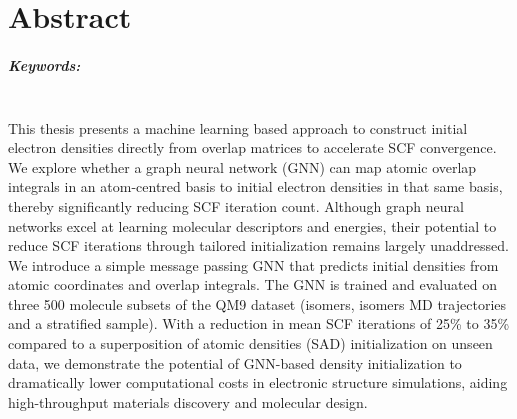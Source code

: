\chapter*{Abstract}

\paragraph{Keywords:}
\mykeywordsabstract\\

This thesis presents a machine learning based approach to construct initial electron densities directly from overlap matrices to accelerate SCF convergence. We explore whether a graph neural network (GNN) can map atomic overlap integrals in an atom-centred basis to initial electron densities in that same basis, thereby significantly reducing SCF iteration count. Although graph neural networks excel at learning molecular descriptors and energies, their potential to reduce SCF iterations through tailored initialization remains largely unaddressed. We introduce a simple message passing GNN that predicts initial densities from atomic coordinates and overlap integrals. The GNN is trained and evaluated on three 500 molecule subsets of the QM9 dataset (isomers, isomers MD trajectories and a stratified sample). With a reduction in mean SCF iterations of 25\% to 35\% compared to a superposition of atomic densities (SAD) initialization on unseen data, we demonstrate the potential of GNN-based density initialization to dramatically lower computational costs in electronic structure simulations, aiding high-throughput materials discovery and molecular design.